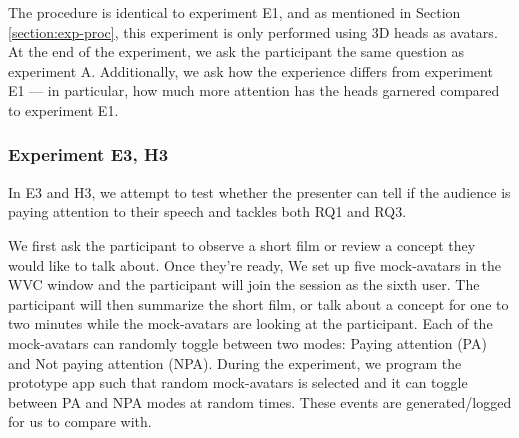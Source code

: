 The procedure is identical to experiment E1, and as mentioned in Section \ref{section:exp-proc}, this experiment is only performed using 3D heads as avatars.
At the end of the experiment, we ask the participant the same question as experiment A.
Additionally, we ask how the experience differs from experiment E1 --- in particular, 
how much more attention has the heads garnered compared to experiment E1.





\subsubsection{Experiment E3, H3}

In E3 and H3, we attempt to test whether the presenter can tell if the audience is paying attention to their speech and tackles both RQ1 and RQ3.

We first ask the participant to observe a short film or review a concept they would like to talk about. Once they're ready, We set up five mock-avatars in the WVC window and the participant will join the session as the sixth user.
The participant will then summarize the short film, or talk about a concept for one to two minutes while the mock-avatars are looking at the participant.
Each of the mock-avatars can randomly toggle between two modes: Paying attention (PA) and Not paying attention (NPA). During the experiment, we program the prototype app such that random mock-avatars is selected and it can toggle between PA and NPA modes at random times. These events are generated/logged for us to compare with.

